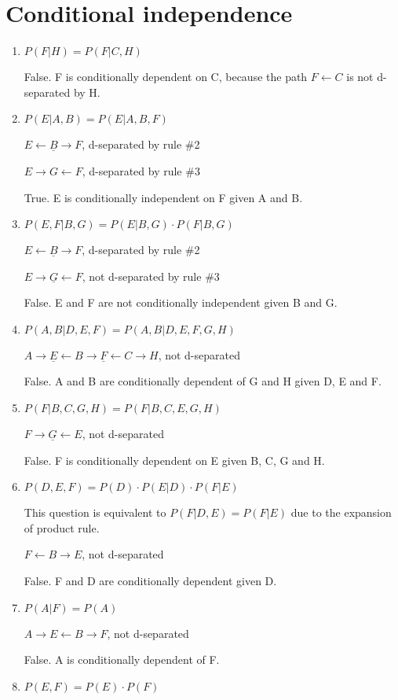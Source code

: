 \documentclass[11]{article}
\begin{document}
\section{Conditional independence}
\begin{enumerate}[label=(\alph*)]
\item $P(F|H)=P(F|C,H)$

False. F is conditionally dependent on C, because the path $F \leftarrow C$ is not d-separated by H.
\item $P(E|A,B)=P(E|A,B,F)$

$E\leftarrow \underline{B}\rightarrow F$, d-separated by rule \#2

$E\rightarrow G \leftarrow F$, d-separated by rule \#3

True. E is conditionally independent on F given A and B.
\item $P(E,F|B,G)=P(E|B,G) \cdot P(F|B,G)$

$E\leftarrow \underline{B}\rightarrow F$, d-separated by rule \#2

$E\rightarrow \underline{G} \leftarrow F$, not d-separated by rule \#3

False. E and F are not conditionally independent given B and G.
\item $P(A,B|D,E,F)=P(A,B|D,E,F,G,H)$

$A \rightarrow \underline{E} \leftarrow B \rightarrow \underline{F} \leftarrow C \rightarrow H$, not d-separated

False. A and B are conditionally dependent of G and H given D, E and F.
\item $P(F|B,C,G,H)=P(F|B,C,E,G,H)$

$F \rightarrow \underline{G} \leftarrow E$, not d-separated

False. F is conditionally dependent on E given B, C, G and H.
\item $P(D,E,F)=P(D) \cdot P(E|D) \cdot P(F|E)$

This question is equivalent to $P(F|D,E)=P(F|E)$ due to the expansion of product rule.

$F \leftarrow B \rightarrow E$, not d-separated

False. F and D are conditionally dependent given D.
\item $P(A|F)=P(A)$

$A \rightarrow E \leftarrow B \rightarrow F$, not d-separated

False. A is conditionally dependent of F.
\item $P(E,F)=P(E) \cdot P(F)$


\end{enumerate}
\end{document}
